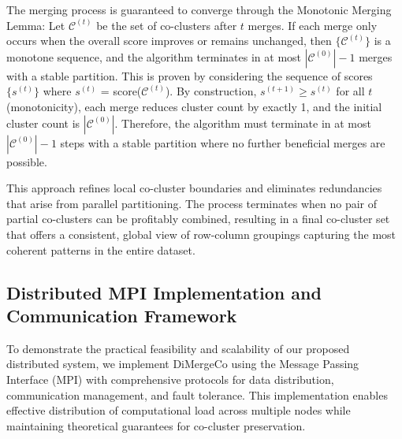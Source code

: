 \documentclass[journal]{IEEEtran}
\begin{document}
The merging process is guaranteed to converge through the Monotonic Merging Lemma: Let $\mathcal{C}^{(t)}$ be the set of co-clusters after $t$ merges. If each merge only occurs when the overall score improves or remains unchanged, then $\{\mathcal{C}^{(t)}\}$ is a monotone sequence, and the algorithm terminates in at most $|\mathcal{C}^{(0)}|-1$ merges with a stable partition. This is proven by considering the sequence of scores $\{s^{(t)}\}$ where $s^{(t)}$ = score($\mathcal{C}^{(t)}$). By construction, $s^{(t+1)} \geq s^{(t)}$ for all $t$ (monotonicity), each merge reduces cluster count by exactly 1, and the initial cluster count is $|\mathcal{C}^{(0)}|$. Therefore, the algorithm must terminate in at most $|\mathcal{C}^{(0)}|-1$ steps with a stable partition where no further beneficial merges are possible.

This approach refines local co-cluster boundaries and eliminates redundancies that arise from parallel partitioning. The process terminates when no pair of partial co-clusters can be profitably combined, resulting in a final co-cluster set that offers a consistent, global view of row-column groupings capturing the most coherent patterns in the entire dataset.

\subsection{Distributed MPI Implementation and Communication Framework}
\label{subsec:mpi-implementation}

{\color{blue}
    To demonstrate the practical feasibility and scalability of our proposed distributed system, we implement DiMergeCo using the Message Passing Interface (MPI) with comprehensive protocols for data distribution, communication management, and fault tolerance. This implementation enables effective distribution of computational load across multiple nodes while maintaining theoretical guarantees for co-cluster preservation.
}
\end{document}
